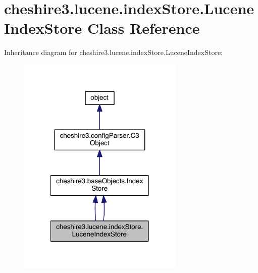 \hypertarget{classcheshire3_1_1lucene_1_1index_store_1_1_lucene_index_store}{\section{cheshire3.\-lucene.\-index\-Store.\-Lucene\-Index\-Store Class Reference}
\label{classcheshire3_1_1lucene_1_1index_store_1_1_lucene_index_store}
}


Inheritance diagram for cheshire3.\-lucene.\-index\-Store.\-Lucene\-Index\-Store\-:
\nopagebreak
\begin{figure}[H]
\begin{center}
\leavevmode
\includegraphics[width=224pt]{classcheshire3_1_1lucene_1_1index_store_1_1_lucene_index_store__inherit__graph}
\end{center}
\end{figure}


